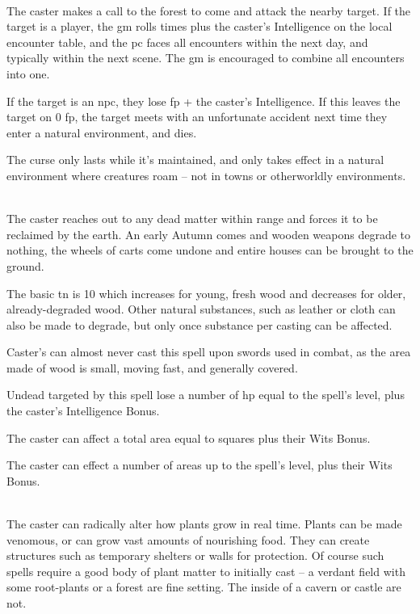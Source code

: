 \begin{multicols}{2}
\\
The caster makes a call to the forest to come and attack the nearby target.  If the target is a player, the \gls{gm} rolls  times plus the caster's Intelligence on the local encounter table, and the \gls{pc} faces all encounters within the next day, and typically within the next scene.  The \gls{gm} is encouraged to combine all encounters into one.

If the target is an \gls{npc}, they lose  \gls{fp} + the caster's Intelligence.  If this leaves the target on 0 \gls{fp}, the target meets with an unfortunate accident next time they enter a natural environment, and dies.

The curse only lasts while it's maintained, and only takes effect in a natural environment where creatures roam -- not in towns or otherworldly environments.

\\
The caster reaches out to any dead matter within range and forces it to be reclaimed by the earth. An early Autumn comes and wooden weapons degrade to nothing, the wheels of carts come undone and entire houses can be brought to the ground.

The basic \gls{tn} is 10 which increases for young, fresh wood and decreases for older, already-degraded wood. Other natural substances, such as leather or cloth can also be made to degrade, but only once substance per casting can be affected.

Caster's can almost never cast this spell upon swords used in combat, as the area made of wood is small, moving fast, and generally covered.

Undead targeted by this spell lose a number of \gls{hp} equal to the spell's level, plus the caster's Intelligence Bonus.


The caster can affect a total area equal to  squares plus their Wits Bonus. 


The caster can effect a number of areas up to the spell's level, plus their Wits Bonus.

\spelllevel

\\
The caster can radically alter how plants grow in real time. Plants can be made venomous, or can grow vast amounts of nourishing food. They can create structures such as temporary shelters or walls for protection. Of course such spells require a good body of plant matter to initially cast -- a verdant field with some root-plants or a forest are fine setting. The inside of a cavern or castle are not.


\end{multicols}
